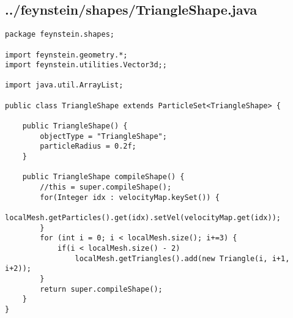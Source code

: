 \subsection*{../feynstein/shapes/TriangleShape.java}
\begin{lstlisting}
package feynstein.shapes;

import feynstein.geometry.*;
import feynstein.utilities.Vector3d;;

import java.util.ArrayList;

public class TriangleShape extends ParticleSet<TriangleShape> {
	
	public TriangleShape() {
		objectType = "TriangleShape";
		particleRadius = 0.2f;
	}
    
    public TriangleShape compileShape() {
		//this = super.compileShape();
		for(Integer idx : velocityMap.keySet()) {
			localMesh.getParticles().get(idx).setVel(velocityMap.get(idx));
		}		
		for (int i = 0; i < localMesh.size(); i+=3) {
			if(i < localMesh.size() - 2)
				localMesh.getTriangles().add(new Triangle(i, i+1, i+2));
		}
		return super.compileShape();
    }
}\end{lstlisting}


